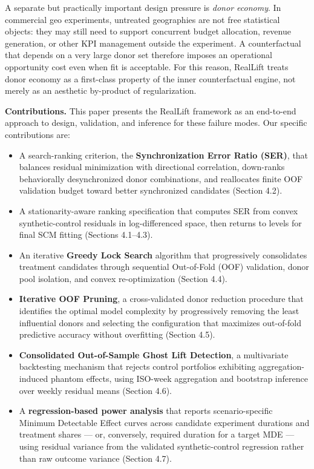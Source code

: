 \documentclass[11pt]{article}
\begin{document}
A separate but practically important design pressure is \emph{donor economy}. In commercial geo experiments, untreated geographies are not free statistical objects: they may still need to support concurrent budget allocation, revenue generation, or other KPI management outside the experiment. A counterfactual that depends on a very large donor set therefore imposes an operational opportunity cost even when fit is acceptable. For this reason, RealLift treats donor economy as a first-class property of the inner counterfactual engine, not merely as an aesthetic by-product of regularization.

\textbf{Contributions.} This paper presents the RealLift framework as an end-to-end approach to design, validation, and inference for these failure modes. Our specific contributions are:

\begin{itemize}
\item A search-ranking criterion, the \textbf{Synchronization Error Ratio (SER)}, that balances residual minimization with directional correlation, down-ranks behaviorally desynchronized donor combinations, and reallocates finite OOF validation budget toward better synchronized candidates (Section 4.2).
\item A stationarity-aware ranking specification that computes SER from convex synthetic-control residuals in log-differenced space, then returns to levels for final SCM fitting (Sections 4.1--4.3).
\item An iterative \textbf{Greedy Lock Search} algorithm that progressively consolidates treatment candidates through sequential Out-of-Fold (OOF) validation, donor pool isolation, and convex re-optimization (Section 4.4).
\item \textbf{Iterative OOF Pruning}, a cross-validated donor reduction procedure that identifies the optimal model complexity by progressively removing the least influential donors and selecting the configuration that maximizes out-of-fold predictive accuracy without overfitting (Section 4.5).
\item \textbf{Consolidated Out-of-Sample Ghost Lift Detection}, a multivariate backtesting mechanism that rejects control portfolios exhibiting aggregation-induced phantom effects, using ISO-week aggregation and bootstrap inference over weekly residual means (Section 4.6).
\item A \textbf{regression-based power analysis} that reports scenario-specific Minimum Detectable Effect curves across candidate experiment durations and treatment shares --- or, conversely, required duration for a target MDE --- using residual variance from the validated synthetic-control regression rather than raw outcome variance (Section 4.7).

\end{itemize}
\end{document}
